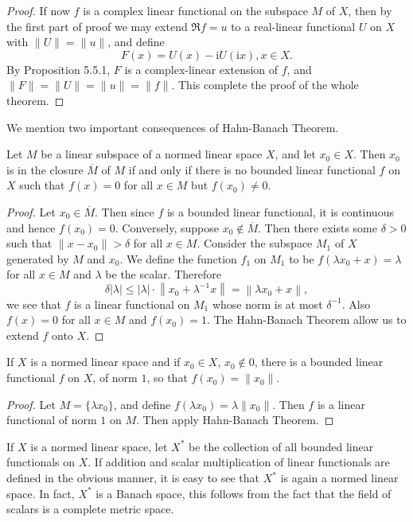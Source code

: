 \begin{proof}
If now $f$ is a complex linear functional on the subspace $M$ of $X$, then by the first part of proof we may extend $\Re f=u$ to a real-linear functional $U$ on $X$ with $\|U\|=\|u\|$, and define 
$$F(x)=U(x)-\mathrm{i}U(\mathrm{i}x),x\in X.$$
By Proposition 5.5.1, $F$ is a complex-linear extension of $f$, and $\|F\|=\|U\|=\|u\|=\|f\|$. This complete the proof of the whole theorem.
\end{proof}
We mention two important consequences of Hahn-Banach Theorem.
\begin{theorem}
Let $M$ be a linear subspace of a normed linear space $X$, and let $x_0\in X$. Then $x_0$ is in the closure $\overline{M}$ of $M$ if and only if there is no bounded linear functional $f$ on $X$ such that $f(x)=0$ for all $x\in M$ but $f(x_0)\ne 0$.
\end{theorem}
\begin{proof}
Let $x_0\in\overline{M}$. Then since $f$ is a bounded linear functional, it is continuous and hence $f(x_0)=0$. Conversely, suppose $x_0\notin\overline{M}$. Then there exists some $\delta>0$ such that $\|x-x_0\|>\delta$ for all $x\in M$. Consider the subspace $M_1$ of $X$ generated by $M$ and $x_0$. We define the function $f_1$ on $M_1$ to be $f(\lambda x_0+x)=\lambda$ for all $x\in M$ and $\lambda$ be the scalar. Therefore 
$$
\delta \left| \lambda \right|\le \left| \lambda \right|\cdot \left\| x_0+\lambda ^{-1}x \right\| =\left\| \lambda x_0+x \right\| ,
$$
we see that $f$ is a linear functional on $M_1$ whose norm is at most $\delta^{-1}$. Also $f(x)=0$ for all $x\in M$ and $f(x_0)=1$. The Hahn-Banach Theorem allow us to extend $f$ onto $X$.
\end{proof}
\begin{theorem}
If $X$ is a normed linear space and if $x_0\in X$, $x_0\notin 0$, there is a bounded linear functional $f$ on $X$, of norm $1$, so that $f(x_0)=\|x_0\|$.
\end{theorem}
\begin{proof}
Let $M=\{\lambda x_0\}$, and define $f(\lambda x_0)=\lambda\|x_0\|$. Then $f$ is a linear functional of norm $1$ on $M$. Then apply Hahn-Banach Theorem.
\end{proof}
If $X$ is a normed linear space, let $X^*$ be the collection of all bounded linear functionals on $X$. If addition and scalar multiplication of linear functionals are defined in the obvious manner, it is easy to see that $X^*$ is again a normed linear space. In fact, $X^*$ is a Banach space, this follows from the fact that the field of scalars is a complete metric space.\par
